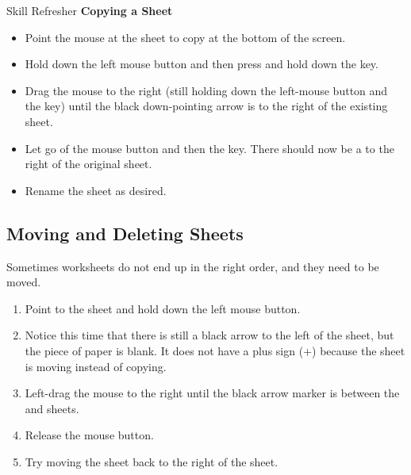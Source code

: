 \begin{center}
	\begin{sklbox}{Skill Refresher}
		\textbf{Copying a Sheet}
		\\
		\begin{itemize}
			\setlength{\itemsep}{0pt}
			\setlength{\parskip}{0pt}
			\setlength{\parsep}{0pt}
			
			\item Point the mouse at the sheet to copy at the bottom of the screen.
			\item Hold down the left mouse button and then press and hold down the  key.
			\item Drag the mouse to the right (still holding down the left-mouse button and the  key) until the black down-pointing arrow is to the right of the existing sheet.
			\item Let go of the mouse button and then the  key. There should now be a  to the right of the original sheet.
			\item Rename the  sheet as desired.
			
		\end{itemize}
	\end{sklbox}
\end{center}

\subsection{Moving and Deleting Sheets}

Sometimes worksheets do not end up in the right order, and they need to be moved.

\begin{enumerate}
	\item Point to the  sheet and hold down the left mouse button.
	\item Notice this time that there is still a black arrow to the left of the  sheet, but the piece of paper is blank. It does not have a plus sign ($ + $) because the sheet is moving instead of copying.
	\item Left-drag the mouse to the right until the black arrow marker is between the  and  sheets.
	\item Release the mouse button.
	\item Try moving the  sheet back to the right of the  sheet.
\end{enumerate}


